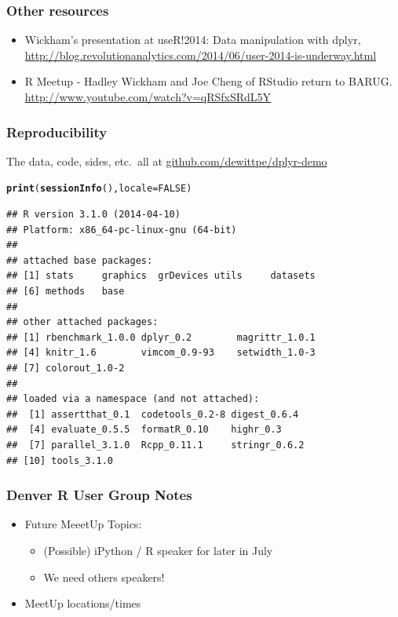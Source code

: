 \documentclass{beamer}\usepackage[]{graphicx}\usepackage[]{color}
\makeatletter
\newcommand{\hlnum}[1]{\textcolor[rgb]{0.686,0.059,0.569}{#1}}%
\newcommand{\hlstd}[1]{\textcolor[rgb]{0.345,0.345,0.345}{#1}}%
\newcommand{\hlkwc}[1]{\textcolor[rgb]{0.333,0.667,0.333}{#1}}%
\newcommand{\hlkwd}[1]{\textcolor[rgb]{0.737,0.353,0.396}{\textbf{#1}}}%
\newenvironment{kframe}{%
 \def\at@end@of@kframe{}%
 \ifinner\ifhmode%
  \def\at@end@of@kframe{\end{minipage}}%
  \begin{minipage}{\columnwidth}%
 \fi\fi%
 \def\FrameCommand##1{\hskip\@totalleftmargin \hskip-\fboxsep
 \colorbox{shadecolor}{##1}\hskip-\fboxsep
     \hskip-\linewidth \hskip-\@totalleftmargin \hskip\columnwidth}%
 \MakeFramed {\advance\hsize-\width
   \@totalleftmargin\z@ \linewidth\hsize
   \@setminipage}}%
 {\par\unskip\endMakeFramed%
 \at@end@of@kframe}
\newenvironment{knitrout}{}{} %
\makeatother
\begin{document}
\begin{frame}[fragile]
  \frametitle{Other resources}
  \begin{itemize}
    \item Wickham's presentation at useR!2014: Data manipulation with dplyr,
      \url{http://blog.revolutionanalytics.com/2014/06/user-2014-is-underway.html}

    \item R Meetup - Hadley Wickham and Joe Cheng of RStudio return to BARUG.
      \url{http://www.youtube.com/watch?v=qRSfxSRdL5Y}

  \end{itemize}
\end{frame} 

\begin{frame}[fragile]
  \frametitle{Reproducibility}
  The data, code, sides, etc.\ all at \url{github.com/dewittpe/dplyr-demo}

\begin{knitrout}\footnotesize
{}\color{fgcolor}\begin{kframe}
\begin{alltt}
\hlkwd{print}\hlstd{(}\hlkwd{sessionInfo}\hlstd{(),} \hlkwc{locale} \hlstd{=} \hlnum{FALSE}\hlstd{)}
\end{alltt}
\begin{verbatim}
## R version 3.1.0 (2014-04-10)
## Platform: x86_64-pc-linux-gnu (64-bit)
## 
## attached base packages:
## [1] stats     graphics  grDevices utils     datasets 
## [6] methods   base     
## 
## other attached packages:
## [1] rbenchmark_1.0.0 dplyr_0.2        magrittr_1.0.1  
## [4] knitr_1.6        vimcom_0.9-93    setwidth_1.0-3  
## [7] colorout_1.0-2  
## 
## loaded via a namespace (and not attached):
##  [1] assertthat_0.1  codetools_0.2-8 digest_0.6.4   
##  [4] evaluate_0.5.5  formatR_0.10    highr_0.3      
##  [7] parallel_3.1.0  Rcpp_0.11.1     stringr_0.6.2  
## [10] tools_3.1.0
\end{verbatim}
\end{kframe}
\end{knitrout}
\end{frame} 

\begin{frame}[fragile]
  \frametitle{Denver R User Group Notes}
  \begin{itemize}
    \item Future MeeetUp Topics:
      \begin{itemize}
        \item (Possible) iPython / R speaker for later in July
        \item We need others speakers!
      \end{itemize}
    \item MeetUp locations/times
  \end{itemize}
\end{frame} 
\end{document}
